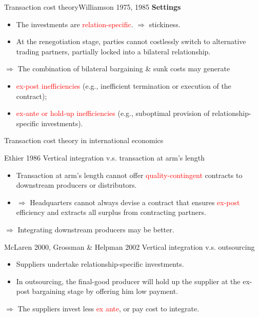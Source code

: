 \documentclass{beamer}
\begin{document}
\begin{frame}{Transaction cost theory}{Williamson 1975, 1985}
	\textbf{Settings}
	\begin{itemize}
		\item The investments are \textcolor{red}{relation-specific}. $\Rightarrow$ stickiness.
		\item At the renegotiation stage, parties cannot costlessly switch to alternative trading partners, partially locked into a bilateral relationship.
	\end{itemize}
	\medskip
	$\Rightarrow$ The combination of bilateral bargaining \& sunk costs may generate
	\begin{itemize}
		\item \textcolor{red}{ex-post inefficiencies} (e.g., inefficient termination or execution of the contract);
		\item \textcolor{red}{ex-ante or hold-up inefficiencies} (e.g., suboptimal provision of relationship-specific investments).
	\end{itemize}
\end{frame}
\begin{frame}{Transaction cost theory in international economics}
	\begin{block}{Ethier 1986}
		Vertical integration v.s. transaction at arm's length
	\begin{itemize}
		\item Transaction at arm's length cannot offer \textcolor{red}{quality-contingent} contracts to downstream producers or distributors.
		\item $\Rightarrow$ Headquarters cannot always devise a contract that ensures \textcolor{red}{ex-post} efficiency and extracts all surplus from contracting partners.
	\end{itemize}
	$\Rightarrow$ Integrating downstream producers may be better.
	\end{block}
	\begin{block}{McLaren 2000, Grossman \& Helpman 2002}
		Vertical integration v.s. outsourcing
	\begin{itemize}
		\item Suppliers undertake relationship-specific investments.
		\item In outsourcing, the final-good producer will hold up the supplier at the ex-post bargaining stage by offering him low payment.
	\end{itemize}
	$\Rightarrow$ The suppliers invest less \textcolor{red}{ex ante}, or pay cost to integrate.
	\end{block}
\end{frame}
\end{document}

